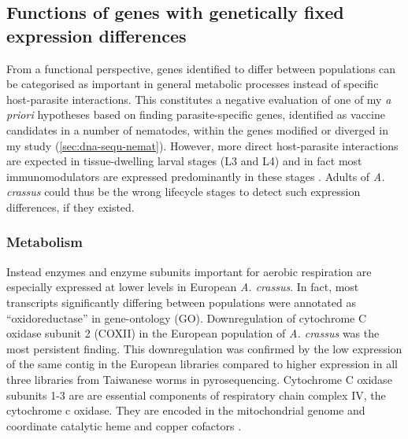 \subsection{Functions of genes with genetically fixed expression
  differences}
\label{sec:function-genes-with}

From a functional perspective, genes identified to differ between
populations can be categorised as important in general metabolic
processes instead of specific host-parasite interactions. This
constitutes a negative evaluation of one of my \textit{a priori}
hypotheses based on finding parasite-specific genes, identified as
vaccine candidates in a number of nematodes, within the genes modified
or diverged in my study (\ref{sec:dna-sequ-nemat}). However, more
direct host-parasite interactions are expected in tissue-dwelling
larval stages (L3 and L4) and in fact most immunomodulators are
expressed predominantly in these stages
\cite{maizels_helminth_2004}. Adults of \textit{A. crassus} could thus
be the wrong lifecycle stages to detect such expression differences,
if they existed.


\subsubsection{Metabolism}
\label{sec:metabolism}

Instead enzymes and enzyme subunits important for aerobic respiration
are especially expressed at lower levels in European
\textit{A. crassus}. In fact, most transcripts significantly differing
between populations were annotated as ``oxidoreductase'' in
gene-ontology (GO). 
Downregulation of cytochrome C oxidase subunit 2 (COXII) in the
European population of \textit{A. crassus} was the most persistent
finding. This downregulation was confirmed by the low expression of
the same contig in the European libraries compared to higher
expression in all three libraries from Taiwanese worms in
pyrosequencing. Cytochrome C oxidase subunits 1-3 are are essential
components of respiratory chain complex IV, the cytochrome c
oxidase. They are encoded in the mitochondrial genome and coordinate
catalytic heme and copper cofactors \cite{pmid18023115}.

